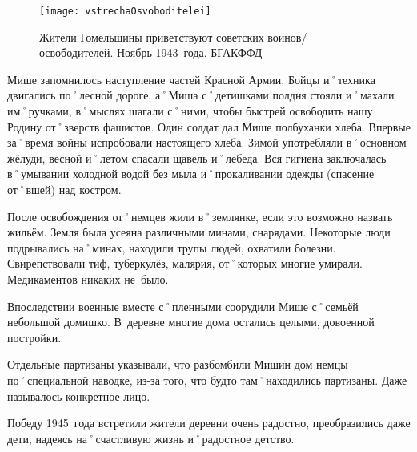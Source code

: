 \begin{wrapfigure}{O}{.4\textwidth}
\centering
\texttt{[image: vstrechaOsvoboditelei]}
\caption{Жители Гомельщины приветствуют советских воинов\-/освободителей. Ноябрь 1943~года. БГАКФФД}
\label{fig:vstrechaOsvoboditelei}
\end{wrapfigure}

Мише запомнилось наступление частей Красной Армии. Бойцы и˚техника двигались по˚лесной дороге, а˚Миша с˚детишками полдня стояли и˚махали им˚ручками, в˚мыслях шагали с˚ними, чтобы быстрей освободить нашу Родину от˚зверств фашистов. Один солдат дал Мише полбуханки хлеба. Впервые за˚время войны испробовали настоящего хлеба. Зимой употребляли в˚основном жёлуди, весной и˚летом спасали щавель и˚лебеда. Вся гигиена заключалась в˚умывании холодной водой без мыла и˚прокаливании одежды (спасение от˚вшей) над костром.

После освобождения от˚немцев жили в˚землянке, если это возможно назвать жильём. Земля была усеяна различными минами, снарядами. Некоторые люди подрывались на˚минах, находили трупы людей, охватили болезни. Свирепствовали тиф, туберкулёз, малярия, от˚которых многие умирали. Медикаментов никаких не~было. 

Впоследствии военные вместе с˚пленными соорудили Мише с˚семьёй небольшой домишко. В~деревне многие дома остались целыми, довоенной постройки. 

Отдельные партизаны указывали, что разбомбили Мишин дом немцы по˚специальной наводке, из-за того, что будто там˚находились партизаны. Даже называлось конкретное лицо. 

Победу 1945~года встретили жители деревни очень радостно, преобразились даже дети, надеясь на˚счастливую жизнь и˚радостное детство.